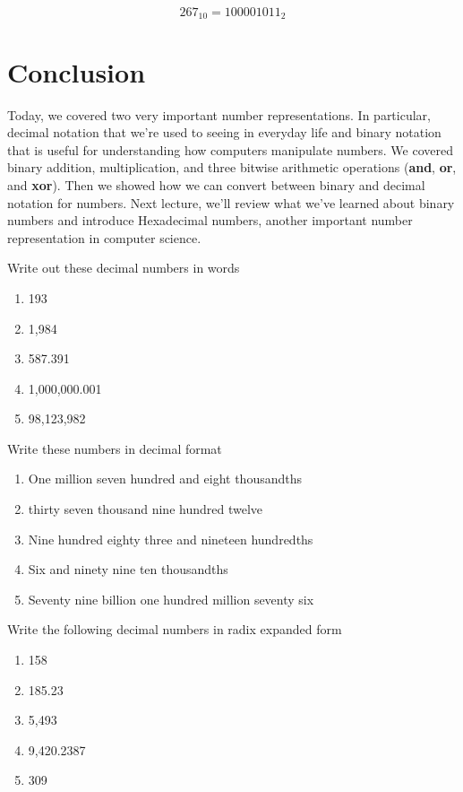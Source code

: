 $$267_{10} = 100001011_2$$

\section{Conclusion}
Today, we covered two very important number representations. In particular,
decimal notation that we’re used to seeing in everyday life and binary notation
that is useful for understanding how computers manipulate numbers. We covered
binary addition, multiplication, and three bitwise arithmetic operations
(\textbf{and}, \textbf{or}, and \textbf{xor}). Then we showed how we can convert
between binary and decimal notation for numbers. Next lecture, we’ll review what
we’ve learned about binary numbers and introduce Hexadecimal numbers, another
important number representation in computer science.

\exercisesection

\begin{exercise}
Write out these decimal numbers in words
\begin{enumerate}
\item 193
\item 1,984
\item 587.391
\item 1,000,000.001
\item 98,123,982
\end{enumerate}
\end{exercise}

\begin{exercise}
Write these numbers in decimal format
\begin{enumerate}
\item One million seven hundred and eight thousandths
\item thirty seven thousand nine hundred twelve
\item Nine hundred eighty three and nineteen hundredths
\item Six and ninety nine ten thousandths
\item Seventy nine billion one hundred million seventy six
\end{enumerate}
\end{exercise}

\begin{exercise}
Write the following decimal numbers in radix expanded form
\begin{enumerate}
\item 158
\item 185.23
\item 5,493
\item 9,420.2387
\item 309
\end{enumerate}
\end{exercise}

